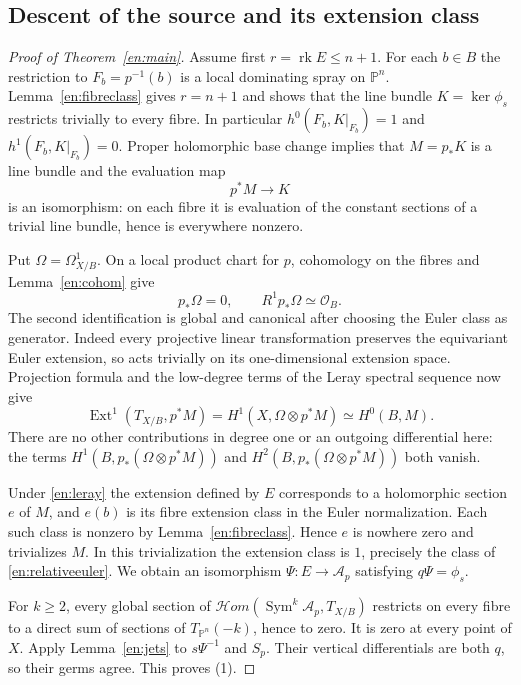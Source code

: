 \documentclass[12pt]{amsart}
\theoremstyle{definition}
\theoremstyle{remark}
\numberwithin{equation}{section}
\newcommand{\rk}{\operatorname{rk}}
\newcommand{\Hom}{\mathscr{H}\!\mathit{om}}
\newcommand{\cA}{\mathcal{A}}
\newcommand{\cO}{\mathcal{O}}
\DeclareMathOperator{\Sym}{Sym}
\newcommand{\mP}{\mathbb{P}}
\DeclareMathOperator{\Ext}{Ext}
\begin{document}
\subsection{Descent of the source and its extension class}
\begin{proof}[Proof of Theorem~\ref{en:main}]
Assume first $r=\rk E\leq n+1$. For each $b\in B$ the restriction to $F_b=p^{-1}(b)$ is a local dominating spray on $\mP^n$. Lemma~\ref{en:fibreclass} gives $r=n+1$ and shows that the line bundle $K=\ker\phi_s$ restricts trivially to every fibre. In particular $h^0(F_b,K|_{F_b})=1$ and $h^1(F_b,K|_{F_b})=0$. Proper holomorphic base change \cite{en:Grauert} implies that $M=p_*K$ is a line bundle and the evaluation map
\[
p^*M\longrightarrow K
\]
is an isomorphism: on each fibre it is evaluation of the constant sections of a trivial line bundle, hence is everywhere nonzero.

Put $\Omega=\Omega^1_{X/B}$. On a local product chart for $p$, cohomology on the fibres and Lemma~\ref{en:cohom} give
\[
p_*\Omega=0,\qquad R^1p_*\Omega\simeq\cO_B.
\]
The second identification is global and canonical after choosing the Euler class as generator. Indeed every projective linear transformation preserves the equivariant Euler extension, so acts trivially on its one-dimensional extension space. Projection formula and the low-degree terms of the Leray spectral sequence now give
\begin{equation}\label{en:leray}
\Ext^1(T_{X/B},p^*M)
=H^1(X,\Omega\otimes p^*M)
\simeq H^0(B,M).
\end{equation}
There are no other contributions in degree one or an outgoing differential here: the terms $H^1(B,p_*(\Omega\otimes p^*M))$ and $H^2(B,p_*(\Omega\otimes p^*M))$ both vanish.

Under \eqref{en:leray} the extension defined by $E$ corresponds to a holomorphic section $e$ of $M$, and $e(b)$ is its fibre extension class in the Euler normalization. Each such class is nonzero by Lemma~\ref{en:fibreclass}. Hence $e$ is nowhere zero and trivializes $M$. In this trivialization the extension class is $1$, precisely the class of \eqref{en:relativeeuler}. We obtain an isomorphism $\Psi:E\to\cA_p$ satisfying $q\Psi=\phi_s$.

For $k\geq2$, every global section of
$\Hom(\Sym^k\cA_p,T_{X/B})$ restricts on every fibre to a direct sum of sections of $T_{\mP^n}(-k)$, hence to zero. It is zero at every point of $X$. Apply Lemma~\ref{en:jets} to $s\Psi^{-1}$ and $S_p$. Their vertical differentials are both $q$, so their germs agree. This proves (1).


\end{proof}
\end{document}
